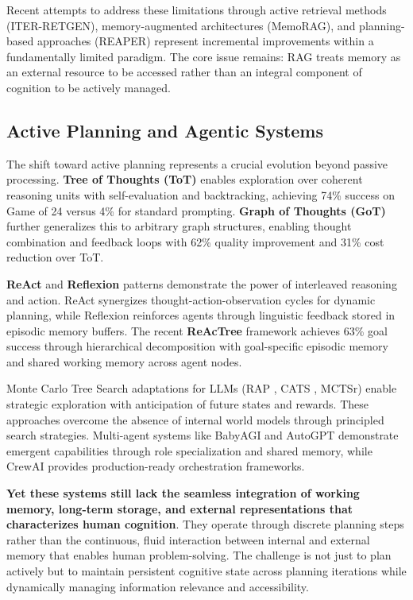 \documentclass[10pt,twocolumn]{article}
\begin{document}
Recent attempts to address these limitations through active retrieval methods (ITER-RETGEN), memory-augmented architectures (MemoRAG), and planning-based approaches (REAPER) represent incremental improvements within a fundamentally limited paradigm. The core issue remains: RAG treats memory as an external resource to be accessed rather than an integral component of cognition to be actively managed.

\subsection{Active Planning and Agentic Systems}

The shift toward active planning represents a crucial evolution beyond passive processing. \textbf{Tree of Thoughts (ToT)} \cite{yao2024tree} enables exploration over coherent reasoning units with self-evaluation and backtracking, achieving 74\% success on Game of 24 versus 4\% for standard prompting. \textbf{Graph of Thoughts (GoT)} \cite{besta2024graph} further generalizes this to arbitrary graph structures, enabling thought combination and feedback loops with 62\% quality improvement and 31\% cost reduction over ToT.

\textbf{ReAct} \cite{yao2023react} and \textbf{Reflexion} \cite{shinn2023reflexion} patterns demonstrate the power of interleaved reasoning and action. ReAct synergizes thought-action-observation cycles for dynamic planning, while Reflexion reinforces agents through linguistic feedback stored in episodic memory buffers. The recent \textbf{ReAcTree} framework achieves 63\% goal success through hierarchical decomposition with goal-specific episodic memory \cite{zhao2024expel} and shared working memory across agent nodes.

Monte Carlo Tree Search adaptations for LLMs (RAP \cite{hao2023reasoning}, CATS \cite{zhang2024cost}, MCTSr) enable strategic exploration with anticipation of future states and rewards. These approaches overcome the absence of internal world models through principled search strategies. Multi-agent systems like BabyAGI \cite{significant2023babyagi} and AutoGPT demonstrate emergent capabilities through role specialization and shared memory, while CrewAI provides production-ready orchestration frameworks.

\textbf{Yet these systems still lack the seamless integration of working memory, long-term storage, and external representations that characterizes human cognition}. They operate through discrete planning steps rather than the continuous, fluid interaction between internal and external memory that enables human problem-solving. The challenge is not just to plan actively but to maintain persistent cognitive state across planning iterations while dynamically managing information relevance and accessibility.
\end{document}
